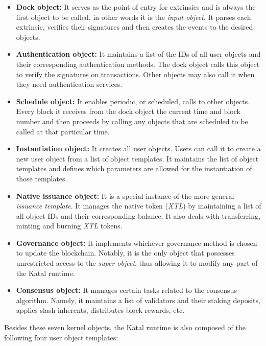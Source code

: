 \documentclass[conference]{IEEEtran}
\begin{document}
\begin{itemize}
	\item \textbf{Dock object:} It serves as the point of entry for extrinsics and is always the first object to be called, in other words it is the \textit{input object}. It parses each extrinsic, verifies their signatures and then creates the events to the desired objects.
	\item \textbf{Authentication object:} It maintains a list of the IDs of all user objects and their corresponding authentication methods. The dock object calls this object to verify the signatures on transactions. Other objects may also call it when they need authentication services.
	\item \textbf{Schedule object:} It enables periodic, or scheduled, calls to other objects. Every block it receives from the dock object the current time and block number and then proceeds by calling any objects that are scheduled to be called at that particular time.
	\item \textbf{Instantiation object:} It creates all user objects. Users can call it to create a new user object from a list of object templates. It maintains the list of object templates and defines which parameters are allowed for the instantiation of those templates.
	\item \textbf{Native issuance object:} It is a special instance of the more general \textit{issuance template}. It manages the native token (\textit{XTL}) by maintaining a list of all object IDs and their corresponding balance. It also deals with transferring, minting and burning \textit{XTL} tokens.
	\item \textbf{Governance object:} It implements whichever governance method is chosen to update the blockchain. Notably, it is the only object that possesses unrestricted access to the \textit{super object}, thus allowing it to modify any part of the Katal runtime.
	\item \textbf{Consensus object:} It manages certain tasks related to the consensus algorithm. Namely, it maintains a list of validators and their staking deposits, applies slash inherents, distributes block rewards, etc.
\end{itemize}

Besides these seven kernel objects, the Katal runtime is also composed of the following four user object templates:
\end{document}
